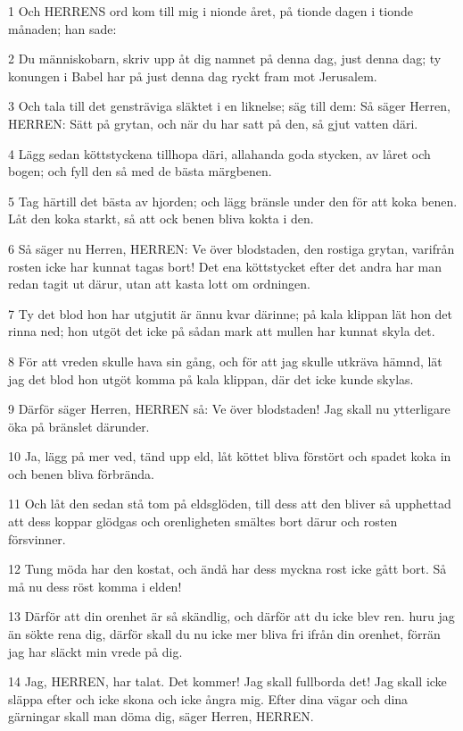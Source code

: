\par 1 Och HERRENS ord kom till mig i nionde året, på tionde dagen i tionde månaden; han sade:
\par 2 Du människobarn, skriv upp åt dig namnet på denna dag, just denna dag; ty konungen i Babel har på just denna dag ryckt fram mot Jerusalem.
\par 3 Och tala till det gensträviga släktet i en liknelse; säg till dem: Så säger Herren, HERREN: Sätt på grytan, och när du har satt på den, så gjut vatten däri.
\par 4 Lägg sedan köttstyckena tillhopa däri, allahanda goda stycken, av låret och bogen; och fyll den så med de bästa märgbenen.
\par 5 Tag härtill det bästa av hjorden; och lägg bränsle under den för att koka benen. Låt den koka starkt, så att ock benen bliva kokta i den.
\par 6 Så säger nu Herren, HERREN: Ve över blodstaden, den rostiga grytan, varifrån rosten icke har kunnat tagas bort! Det ena köttstycket efter det andra har man redan tagit ut därur, utan att kasta lott om ordningen.
\par 7 Ty det blod hon har utgjutit är ännu kvar därinne; på kala klippan lät hon det rinna ned; hon utgöt det icke på sådan mark att mullen har kunnat skyla det.
\par 8 För att vreden skulle hava sin gång, och för att jag skulle utkräva hämnd, lät jag det blod hon utgöt komma på kala klippan, där det icke kunde skylas.
\par 9 Därför säger Herren, HERREN så: Ve över blodstaden! Jag skall nu ytterligare öka på bränslet därunder.
\par 10 Ja, lägg på mer ved, tänd upp eld, låt köttet bliva förstört och spadet koka in och benen bliva förbrända.
\par 11 Och låt den sedan stå tom på eldsglöden, till dess att den bliver så upphettad att dess koppar glödgas och orenligheten smältes bort därur och rosten försvinner.
\par 12 Tung möda har den kostat, och ändå har dess myckna rost icke gått bort. Så må nu dess röst komma i elden!
\par 13 Därför att din orenhet är så skändlig, och därför att du icke blev ren. huru jag än sökte rena dig, därför skall du nu icke mer bliva fri ifrån din orenhet, förrän jag har släckt min vrede på dig.
\par 14 Jag, HERREN, har talat. Det kommer! Jag skall fullborda det! Jag skall icke släppa efter och icke skona och icke ångra mig. Efter dina vägar och dina gärningar skall man döma dig, säger Herren, HERREN.
